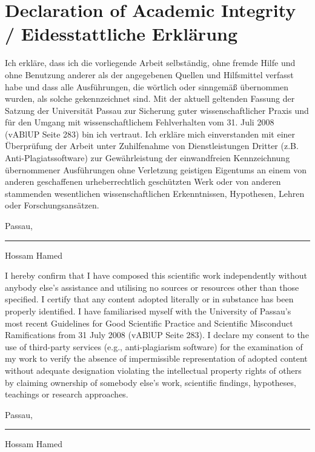 \chapter*{Declaration of Academic Integrity / Eidesstattliche Erkl\"{a}rung}
\begin{flushleft}
	

Ich erkläre, dass ich die vorliegende Arbeit selbständig, ohne fremde Hilfe und ohne Benutzung anderer als der angegebenen Quellen und Hilfsmittel verfasst habe und dass alle Ausführungen, die wörtlich oder sinngemäß übernommen wurden, als solche gekennzeichnet sind. Mit der aktuell geltenden Fassung der Satzung der Universität Passau zur Sicherung guter wissenschaftlicher Praxis und für den Umgang mit wissenschaftlichem Fehlverhalten vom 31. Juli 2008 (vABlUP Seite 283) bin ich vertraut. Ich erkläre mich einverstanden mit einer Überprüfung der Arbeit unter Zuhilfenahme von Dienstleistungen Dritter (z.B. Anti-Plagiatssoftware) zur Gewährleistung der einwandfreien Kennzeichnung übernommener Ausführungen ohne Verletzung geistigen Eigentums an einem von anderen geschaffenen urheberrechtlich geschützten Werk oder von anderen stammenden wesentlichen wissenschaftlichen Erkenntnissen, Hypothesen, Lehren oder Forschungsansätzen.

\vspace{0.5cm}

Passau, \fttoday

\vspace{1.5cm}

\parbox{5cm}{
\hrule \strut Hossam Hamed}

\vspace{1cm}


I hereby confirm that I have composed this scientific work independently without anybody else’s assistance and utilising no sources or resources other than those specified. I certify that any content adopted literally or in substance has been properly identified. I have familiarised myself with the University of Passau’s most recent Guidelines for Good Scientific Practice and Scientific Misconduct Ramifications from 31 July 2008 (vABlUP Seite 283). I declare my consent to the use of third-party services (e.g., anti-plagiarism software) for the examination of my work to verify the absence of impermissible representation of adopted content without adequate designation violating the intellectual property rights of others by claiming ownership of somebody else’s work, scientific findings, hypotheses, teachings or research approaches.


\vspace{0.5cm}

Passau, \fttoday


\vspace{1.5cm}

\parbox{5cm}{
\hrule \strut Hossam Hamed}



\end{flushleft}